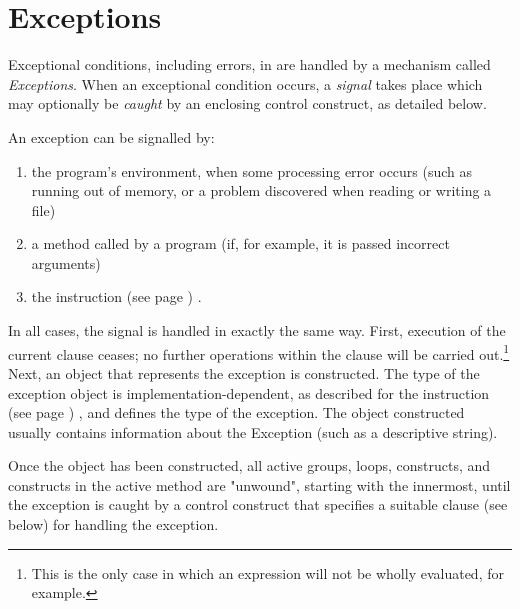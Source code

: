 \chapter{Exceptions}\label{refexcep}
 
Exceptional conditions, including errors, in \nr{} are handled by a
mechanism called \emph{Exceptions}.
When an exceptional condition occurs, a \emph{signal} takes place
which may optionally be \emph{caught} by an enclosing control
construct, as detailed below.
 
An exception can be signalled by:
\begin{enumerate}
\item the program's environment, when some processing error occurs (such
as running out of memory, or a problem discovered when reading or
writing a file)
\item a method called by a \nr{} program (if, for example, it is passed
incorrect arguments)
\item the   instruction (see page \pageref{refsignal}) .
\end{enumerate}
In all cases, the signal is handled in exactly the same way.
First, execution of the current clause ceases; no further operations
within the clause will be carried out.\footnote{
This is the only case in which an expression will not be wholly
evaluated, for example.
}
Next, an object that represents the exception is constructed.  The type
of the exception object is implementation-dependent, as described for
the   instruction (see page \pageref{refsignal}) , and defines the
type of the exception.  The object constructed usually contains
information about the Exception (such as a descriptive string).
 
Once the object has been constructed, all active  groups,
 loops,  constructs, and 
constructs in the active method are "unwound", starting with the
innermost, until the exception is caught by a control construct that
specifies a suitable  clause (see below) for handling the
exception.
 
